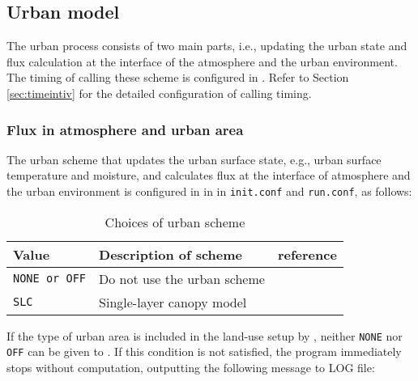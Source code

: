 \subsection{Urban model} \label{subsec:basic_usel_urban}
The urban process consists of two main parts, i.e., updating the urban state and flux calculation at the interface of the atmosphere and the urban environment. The timing of calling these scheme is configured in . Refer to Section \ref{sec:timeintiv} for the detailed configuration of calling timing.

\subsubsection{Flux in atmosphere and urban area}

The urban scheme that updates the urban surface state, e.g., urban surface temperature and moisture, and calculates flux at the interface of atmosphere and the urban environment is configured in  in  in \verb|init.conf| and \verb|run.conf|, as follows:

\begin{table}[hbt]
\begin{center}
  \caption{Choices of urban scheme}
  \label{tab:nml_urban}
  \begin{tabularx}{150mm}{llX} \hline
    \rowcolor[gray]{0.9}  Value  & Description of scheme & reference \\ \hline
      \verb|NONE or OFF|  & Do not use the urban scheme            \\
      \verb|SLC|          & Single-layer canopy model  & \citet{kusaka_2001} \\
    \hline
  \end{tabularx}
\end{center}
\end{table}

If the type of urban area is included in the land-use setup by , neither \verb|NONE| nor \verb|OFF| can be given to . If this condition is not satisfied, the program immediately stops without computation, outputting the following message to LOG file:

